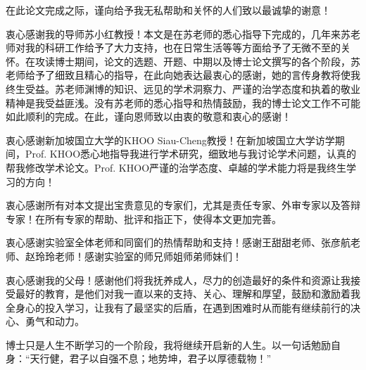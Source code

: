 

在此论文完成之际，谨向给予我无私帮助和关怀的人们致以最诚挚的谢意！

衷心感谢我的导师苏小红教授！本文是在苏老师的悉心指导下完成的，几年来苏老师对我的科研工作给予了大力支持，也在日常生活等等方面给予了无微不至的关怀。在攻读博士期间，论文的选题、开题、中期以及博士论文撰写的各个阶段，苏老师给予了细致且精心的指导，在此向她表达最衷心的感谢，她的言传身教将使我终生受益。苏老师渊博的知识、远见的学术洞察力、严谨的治学态度和执着的敬业精神是我受益匪浅。没有苏老师的悉心指导和热情鼓励，我的博士论文工作不可能如此顺利的完成。在此，谨向恩师致以由衷的敬意和衷心的感谢！

衷心感谢新加坡国立大学的KHOO Siau-Cheng教授！在新加坡国立大学访学期间，Prof. KHOO悉心地指导我进行学术研究，细致地与我讨论学术问题，认真的帮我修改学术论文。Prof. KHOO严谨的治学态度、卓越的学术能力将是我终生学习的方向！

衷心感谢所有对本文提出宝贵意见的专家们，尤其是责任专家、外审专家以及答辩专家！在所有专家的帮助、批评和指正下，使得本文更加完善。

衷心感谢实验室全体老师和同窗们的热情帮助和支持！感谢王甜甜老师、张彦航老师、赵玲玲老师！感谢实验室的师兄师姐师弟师妹们！

衷心感谢我的父母！感谢他们将我抚养成人，尽力的创造最好的条件和资源让我接受最好的教育，是他们对我一直以来的支持、关心、理解和厚望，鼓励和激励着我全身心的投入学习，让我有了最坚实的后盾，在遇到困难时从而能有继续前行的决心、勇气和动力。

博士只是人生不断学习的一个阶段，我将继续开启新的人生。以一句话勉励自身：“天行健，君子以自强不息；地势坤，君子以厚德载物！”
